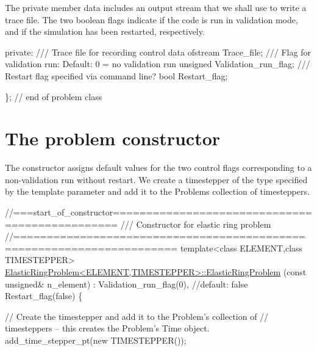 The private member data includes an output stream that we shall use to write a trace file. The two boolean flags indicate if the code is run in validation mode, and if the simulation has been restarted, respectively.


\begin{DoxyCodeInclude}


\textcolor{keyword}{private}:
\textcolor{comment}{}
\textcolor{comment}{ /// Trace file for recording control data}
\textcolor{comment}{} ofstream Trace\_file;
\textcolor{comment}{}
\textcolor{comment}{ /// Flag for validation run: Default: 0 = no validation run}
\textcolor{comment}{} \textcolor{keywordtype}{unsigned} Validation\_run\_flag;
\textcolor{comment}{}
\textcolor{comment}{ /// Restart flag specified via command line?}
\textcolor{comment}{} \textcolor{keywordtype}{bool} Restart\_flag;

\}; \textcolor{comment}{// end of problem class}

\end{DoxyCodeInclude}




 

\hypertarget{index_constructor}{}\section{The problem constructor}\label{index_constructor}
The constructor assigns default values for the two control flags corresponding to a non-\/validation run without restart. We create a timestepper of the type specified by the template parameter and add it to the {\ttfamily Problem\textquotesingle{}s} collection of timesteppers.


\begin{DoxyCodeInclude}
\textcolor{comment}{//===start\_of\_constructor===============================================}
\textcolor{comment}{/// Constructor for elastic ring problem}
\textcolor{comment}{}\textcolor{comment}{//======================================================================}
\textcolor{keyword}{template}<\textcolor{keyword}{class} ELEMENT,\textcolor{keyword}{class} TIMESTEPPER>
\hyperlink{classElasticRingProblem_a57be33a379c1ec4418a7fb3e8db8ef2b}{ElasticRingProblem<ELEMENT,TIMESTEPPER>::ElasticRingProblem}
(\textcolor{keyword}{const} \textcolor{keywordtype}{unsigned}& n\_element) :
 Validation\_run\_flag(0), \textcolor{comment}{//default: false}
 Restart\_flag(false)
\{

 \textcolor{comment}{// Create the timestepper and add it to the Problem's collection of}
 \textcolor{comment}{// timesteppers -- this creates the Problem's Time object.}
 add\_time\_stepper\_pt(\textcolor{keyword}{new} TIMESTEPPER());

\end{DoxyCodeInclude}


